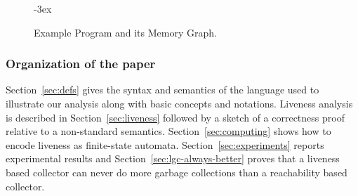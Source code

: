 \begin{figure}[t!]

\kern -3ex

\caption{Example Program and its Memory Graph.}\label{fig:mot-example}    
\end{figure}


\subsubsection{Organization of the paper}
Section~\ref{sec:defs} gives
the syntax and semantics of
the language used to illustrate our analysis along with basic concepts
and    notations.
Liveness analysis is described in
Section~\ref{sec:liveness} followed by a sketch of a correctness
proof relative to a non-standard semantics.
Section~\ref{sec:computing} shows how to encode liveness as
finite-state automata.
Section~\ref{sec:experiments}   reports   experimental   results and
Section~\ref{sec:lgc-always-better} proves that a liveness based
collector can never do more garbage collections than a reachability
based collector. 


